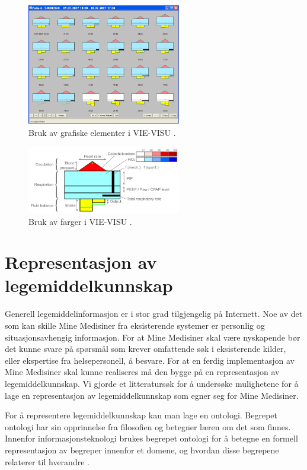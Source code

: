 \begin{figure}[H]
  \centering
    \includegraphics[width=0.6\textwidth]{fig/litteratursok/mange_glyphs.PNG}
  \caption{Bruk av grafiske elementer i VIE-VISU \citep{rind2011interactive}.}
\label{fig:mange_glyphs}
\end{figure}

\begin{figure}[H]
  \centering
    \includegraphics[width=0.6\textwidth]{fig/litteratursok/detalj_glyph.PNG}
  \caption{Bruk av farger i VIE-VISU \citep{rind2011interactive}.}
\label{fig:detalj_glyph}
\end{figure}


\section{Representasjon av legemiddelkunnskap}
Generell legemiddelinformasjon er i stor grad tilgjengelig på Internett. Noe av det som kan skille Mine Medisiner fra eksisterende systemer er personlig og situasjonsavhengig informasjon. For at Mine Medisiner skal være nyskapende bør det kunne svare på spørsmål som krever omfattende søk i eksisterende kilder, eller ekspertise fra helsepersonell, å besvare. For at en ferdig implementasjon av Mine Medisiner skal kunne realiseres må den bygge på en representasjon av legemiddelkunnskap. Vi gjorde et litteratursøk for å undersøke mulighetene for å lage en representasjon av legemiddelkunnskap som egner seg for Mine Medisiner.

For å representere legemiddelkunnskap kan man lage en ontologi. Begrepet ontologi har sin opprinnelse fra filosofien og betegner læren om det som finnes. Innenfor informasjonsteknologi brukes begrepet ontologi for å betegne en formell representasjon av begreper innenfor et domene, og hvordan disse begrepene relaterer til hverandre \citep{barrysmithOnto}.

